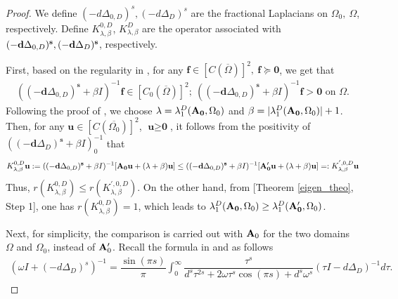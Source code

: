 \documentclass[a4paper,11pt]{amsart}
\theoremstyle{definition}
\def\O{\Omega}
\numberwithin{equation}{section}
\theoremstyle{definition}
\def\O{\Omega}
\begin{document}
\begin{proof}
We define $(-d\Delta_{0,D})^s,(-d\Delta_{D})^s$ are the fractional Laplacians on $\O_0,~\O$, respectively. Define $K^{0,D}_{\lambda,\beta}$, $K^{D}_{\lambda,\beta}$ are the operator associated with $(-{\bf d}\Delta_{0,D})^{\bf s},(-{\bf d}\Delta_{D})^{\bf s}$, respectively.

First, based on the regularity in \cite[Corollary 2.3 (iv)]{zhao_spatiotemporal_2025}, for any $\textbf{f}\in [C(\overline{\O})]^2,~\textbf{f}\succeq  \textbf{0}$, we get that
\begin{align*}
((-\textbf{d}\Delta_{0,D})^{\textbf{s}}+\beta I)^{-1}\textbf{f}\in [C_0(\overline{\O})]^2;~((-\textbf{d}\Delta_{0,D})^{\textbf{s}}+\beta I)^{-1}\textbf{f}>\textbf{0} \text{ on }\O.
\end{align*}
Following the proof of \cite[Proposition 3.4]{lam_ays_2016}, we  choose $\lambda=\lambda^D_1({\bf A_0},\O_0)$ and $\beta=|\lambda^D_1({\bf A_0},\O_0)|+1$. Then, for any $\textbf{u}\in [C(\overline{\O_0})]^2$, $\textbf{u}\geq \textbf{0} $, it follows from the positivity of $((-\textbf{d}\Delta_D)^{\textbf{s}}+\beta I)^{-1}_0$ that
\begin{align*}
K_{\lambda,\beta}^{0,D}\textbf{u}:=((-\textbf{d}\Delta_{0,D})^{\textbf{s}}+\beta I)^{-1}[{\bf A_0u}+(\lambda+\beta)\textbf{u}]\leq ((-\textbf{d}\Delta_{0,D})^{\textbf{s}}+\beta I)^{-1}[{\bf A_0'u}+(\lambda+\beta)\textbf{u}]=:K^{',0,D}_{\lambda,\beta}\textbf{u}
\end{align*}
Thus, $r\left(K_{\lambda,\beta}^{0,D}\right)\leq r\left(K^{',0,D}_{\lambda,\beta}\right)$. On the other hand, from [Theorem \ref{eigen_theo}, Step 1], one has $r\left(K_{\lambda,\beta}^{0,D}\right)=1$, which leads to $\lambda^D_1({\bf A_0},\O_0)\geq \lambda^D_1({\bf A_0'},\O_0)$.

Next, for simplicity, the comparison is carried out with ${\bf A}_0$ for the two domains $\Omega$ and $\Omega_0$, instead of ${\bf A}_0'$. Recall the formula in \cite[Theorem 3.1, Step 1]{zhao_spatiotemporal_2025} and \cite[Proposition 5.3.2]{Martínez_theory_2001} as follows
\begin{align}\label{formula12}
\left(\omega I +(-d\Delta_D)^s\right)^{-1}=\dfrac{\sin(\pi s)}{\pi}\int_0^\infty\dfrac{\tau^s}{d^s\tau^{2s}+2\omega \tau^s \cos(\pi s)+d^s\omega^s}\left(\tau I -d\Delta_D\right)^{-1}d \tau.
\end{align}




\end{proof}
\end{document}

